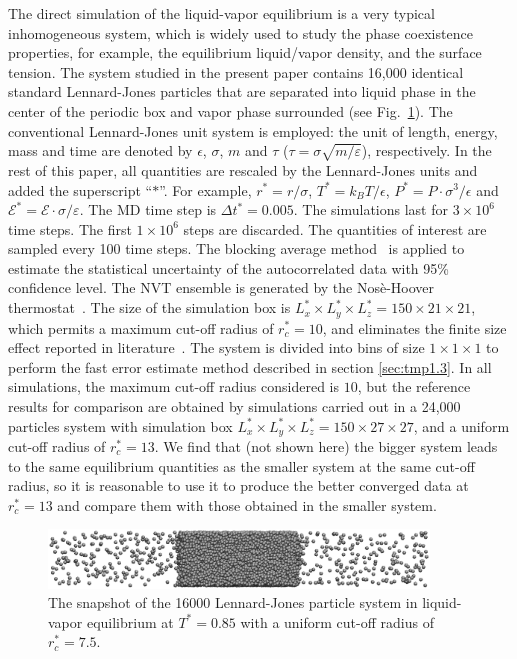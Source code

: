 \documentclass[aps, pre, preprint]{revtex4}
\begin{document}
The direct simulation of the liquid-vapor equilibrium is a very
typical inhomogeneous system, which is widely used to study the phase
coexistence properties, for example, the equilibrium liquid/vapor
density, and the surface tension. The system studied in the present
paper contains 16,000 identical standard Lennard-Jones particles that are
separated into liquid phase in the center of the periodic box and vapor phase
surrounded (see Fig.~\ref{fig:tmp1}).  The conventional Lennard-Jones
unit system is employed: the unit of length, energy, mass and time are
denoted by $\epsilon$, $\sigma$, $m$ and $\tau$ ($\tau =
\sigma\sqrt{m/\varepsilon}$), respectively.  In the rest of this paper,
all quantities are
rescaled by the Lennard-Jones units and added the superscript ``$\ast$''.
For example, $r^\ast = r / \sigma$, $T^\ast = k_BT / \epsilon$,
$P^\ast = P\cdot \sigma^3 / \epsilon$ and $\mathcal E^\ast = \mathcal
E\cdot\sigma/\varepsilon$.  The MD time step {is} $\Delta t^\ast =
0.005$. The simulations last for $3\times 10^6$ time steps. The first
$1\times 10^6$ steps are discarded. The quantities of interest are
sampled every 100 time steps. The blocking average
method~\cite{flyvbjerg1989error} is applied to estimate the
statistical uncertainty of the autocorrelated data with 95\%
confidence level. The NVT ensemble is generated by the Nos\`e-Hoover
thermostat~\cite{nose1984molecular, hoover1985canonical}.  The size of
the simulation box is $L_x^\ast \times L_y^\ast \times L_z^\ast =
150\times 21\times 21$, which permits a maximum cut-off radius of
$r_c^\ast = 10$, and eliminates the finite size effect reported in
literature~\cite{chen1995area, orea2005oscillatory,
  biscay2009calculation}.
The system is divided into bins of size $1\times1\times1$ to perform the fast error
estimate method described in section \ref{sec:tmp1.3}.
In all simulations, the maximum cut-off
radius considered is $10$, but the reference results for comparison
are obtained by simulations carried out in a 24,000 particles system
with simulation box $L_x^\ast \times L_y^\ast \times L_z^\ast =
150\times 27\times 27$, and a uniform cut-off radius of $r_c^\ast =
13$.  {We find that (not shown here)
  the bigger system leads to the same equilibrium
  quantities as the smaller system at the same cut-off radius, so
  it is reasonable to
  use it to produce the better converged data at $r_c^\ast=13$ and compare them with
  those obtained in the smaller system.
}

\begin{figure}
  \centering
  \includegraphics[width=0.9\textwidth]{figs/confout.eps}
  \caption{The snapshot of the 16000 Lennard-Jones particle system in
    liquid-vapor equilibrium at $T^\ast=0.85$ with a uniform cut-off
    radius of $r_c^\ast = 7.5$.}
  \label{fig:tmp1}
\end{figure}
\end{document}
